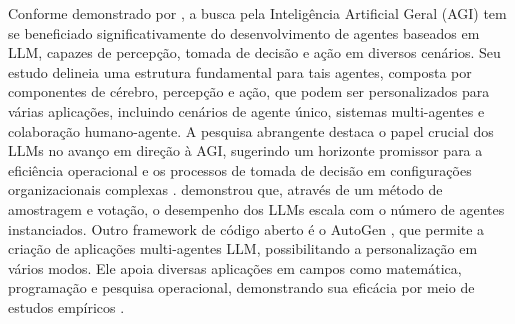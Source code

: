            Conforme demonstrado por \cite{xi2023rise}, a busca pela Inteligência Artificial Geral (AGI) tem se beneficiado significativamente do desenvolvimento de agentes baseados em LLM, capazes de percepção, tomada de decisão e ação em diversos cenários.        
            Seu estudo delineia uma estrutura fundamental para tais agentes, composta por componentes de cérebro, percepção e ação, que podem ser personalizados para várias aplicações, incluindo cenários de agente único, sistemas multi-agentes e colaboração humano-agente. 
            A pesquisa abrangente destaca o papel crucial dos LLMs no avanço em direção à AGI, sugerindo um horizonte promissor para a eficiência operacional e os processos de tomada de decisão em configurações organizacionais complexas \cite{xi2023rise}.
            \cite{Li2024} demonstrou que, através de um método de amostragem e votação, o desempenho dos LLMs escala com o número de agentes instanciados.
            Outro framework de código aberto é o AutoGen \cite{Wu2023}, que permite a criação de aplicações multi-agentes LLM, possibilitando a personalização em vários modos. Ele apoia diversas aplicações em campos como matemática, programação e pesquisa operacional, demonstrando sua eficácia por meio de estudos empíricos \cite{Wu2023}.

